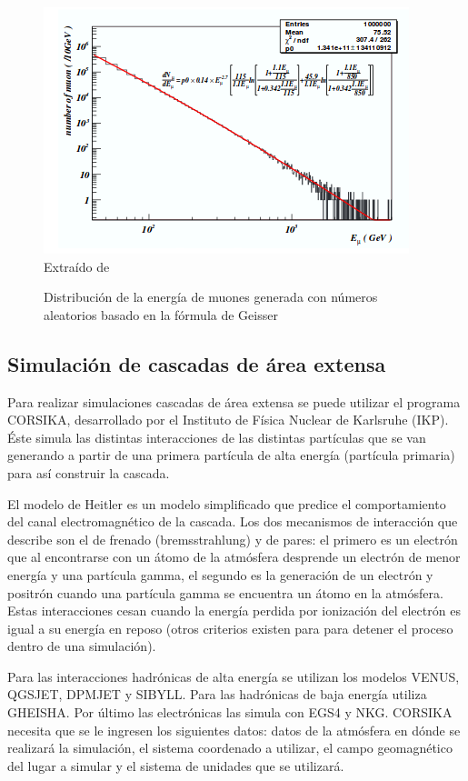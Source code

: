 \documentclass{book}
\begin{document}
\begin{figure}[ht] %
\begin{center}
 \includegraphics[]{GeisserMuon.png}
 Extra\'ido de \citep{GUAN}
\caption{Distribuci\'on de la energ\'ia de muones generada con n\'umeros aleatorios basado en la f\'ormula de Geisser}
\end{center}
\end{figure}

\subsection{Simulaci\'on de cascadas de \'area extensa}
Para realizar simulaciones cascadas de área extensa se puede utilizar el programa CORSIKA, desarrollado por el Instituto de Física Nuclear de Karlsruhe (IKP). Éste simula las distintas interacciones de las distintas partículas que se van generando a partir de una primera partícula de alta energía (partícula primaria) para así construir la cascada. \citep{HECK}

El modelo de Heitler es un modelo simplificado que predice el comportamiento del canal electromagnético de la cascada. Los dos mecanismos de interacción que describe son el de frenado (bremsstrahlung) y de pares: el primero es un electrón que al encontrarse con un átomo de la atmósfera desprende un electrón de menor energía y una partícula gamma, el segundo es la generación de un electrón y positrón cuando una partícula gamma se encuentra un átomo en la atmósfera. Estas interacciones cesan cuando la energía perdida por ionización del electrón es igual a su energía en reposo (otros criterios existen para para detener el proceso dentro de una simulación). \citep{SUAREZ}

Para las interacciones hadrónicas de alta energía se utilizan los modelos VENUS, QGSJET, DPMJET y SIBYLL. Para las hadrónicas de baja energía utiliza GHEISHA. Por último las electrónicas las simula con EGS4 y NKG. CORSIKA necesita que se le ingresen los siguientes datos: datos de la atmósfera en dónde se realizará la simulación, el sistema coordenado a utilizar, el campo geomagnético del lugar a simular y el sistema de unidades que se utilizará. \citep{HECK}
\end{document}
